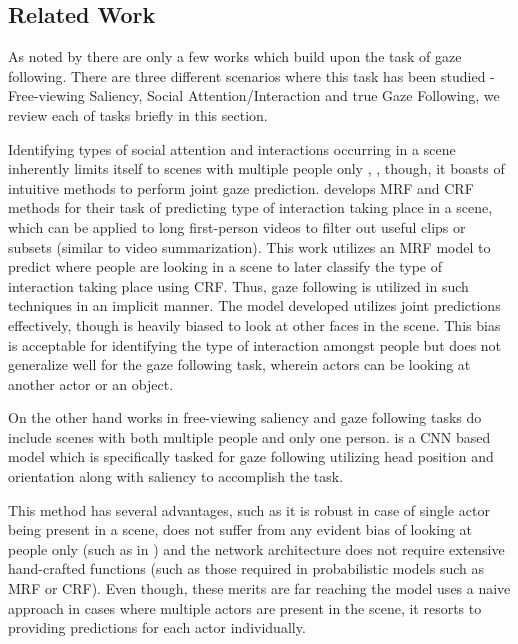 \documentclass[10pt,twocolumn,letterpaper]{article}
\begin{document}
\subsection{Related Work}

As noted by \cite{nips15_recasens} there are only a few works which build upon the task of gaze following. There are three different scenarios where this task has been studied - Free-viewing Saliency, Social Attention/Interaction and true Gaze Following, we review each of tasks briefly in this section.

Identifying types of social attention and interactions occurring in a scene inherently limits itself to scenes with multiple people only \cite{fathi2012social} \cite{marin2014detecting} \cite{soo2015social}, \cite{soo2013predicting}, though, it boasts of intuitive methods to perform joint gaze prediction. \cite{fathi2012social} develops MRF and CRF methods for their task of predicting type of interaction taking place in a scene, which can be applied to long first-person videos to filter out useful clips or subsets (similar to video summarization). This work utilizes an MRF model to predict where people are looking in a scene to later classify the type of interaction taking place using CRF. Thus, gaze following is utilized in such techniques in an implicit manner. The model developed utilizes joint predictions effectively, though is heavily biased to look at other faces in the scene. This bias is acceptable for identifying the type of interaction amongst people but does not generalize well for the gaze following task, wherein actors can be looking at another actor or an object.

 On the other hand works in free-viewing saliency and gaze following tasks do include scenes with both multiple people and only one person. \cite{fathi2012social} is a CNN based model which is specifically tasked for gaze following utilizing head position and orientation along with saliency to accomplish the task.

 This method has several advantages, such as it is robust in case of single actor being present in a scene, does not suffer from any evident bias of looking at people only (such as in \cite{fathi2012social}) and the network architecture does not require extensive hand-crafted functions (such as those required in probabilistic models such as MRF or CRF). Even though, these merits are far reaching the model uses a naive approach in cases where multiple actors are present in the scene, it resorts to providing predictions for each actor individually.
\end{document}
